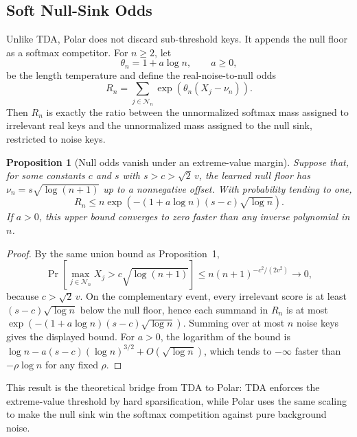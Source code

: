 \documentclass{article} %
\newtheorem{proposition}{Proposition}
\begin{document}
\subsection{Soft Null-Sink Odds}

Unlike TDA, Polar does not discard sub-threshold keys. It appends the null floor as a softmax
competitor. For $n\ge2$, let
\begin{equation}
    \theta_n = 1 + a\log n, \qquad a \ge 0,
\end{equation}
be the length temperature and define the real-noise-to-null odds
\begin{equation}
    R_n = \sum_{j\in\mathcal{N}_n}\exp\left(\theta_n(X_j-\nu_n)\right).
\end{equation}
Then $R_n$ is exactly the ratio between the unnormalized softmax mass assigned to irrelevant
real keys and the unnormalized mass assigned to the null sink, restricted to noise keys.

\begin{proposition}[Null odds vanish under an extreme-value margin]
Suppose that, for some constants $c$ and $s$ with $s>c>\sqrt{2}\,v$, the learned null floor
has $\nu_n=s\sqrt{\log(n+1)}$ up to a nonnegative offset. With probability tending to one,
\begin{equation}
    R_n \le
    n\exp\left(-(1+a\log n)(s-c)\sqrt{\log n}\right).
\end{equation}
If $a>0$, this upper bound converges to zero faster than any inverse polynomial in $n$.
\end{proposition}

\begin{proof}
By the same union bound as Proposition~1,
\begin{equation}
    \Pr\left[\max_{j\in\mathcal{N}_n} X_j > c\sqrt{\log(n+1)}\right]
    \le n(n+1)^{-c^2/(2v^2)} \to 0,
\end{equation}
because $c>\sqrt{2}\,v$. On the complementary event, every irrelevant score is at least
$(s-c)\sqrt{\log n}$ below the null floor, hence each summand in $R_n$ is at most
$\exp(-(1+a\log n)(s-c)\sqrt{\log n})$. Summing over at most $n$ noise keys gives the
displayed bound. For $a>0$, the logarithm of the bound is
$\log n-a(s-c)(\log n)^{3/2}+O(\sqrt{\log n})$, which tends to $-\infty$ faster than
$-\rho\log n$ for any fixed $\rho$.
\end{proof}

This result is the theoretical bridge from TDA to Polar: TDA enforces the extreme-value
threshold by hard sparsification, while Polar uses the same scaling to make the null sink
win the softmax competition against pure background noise.
\end{document}
